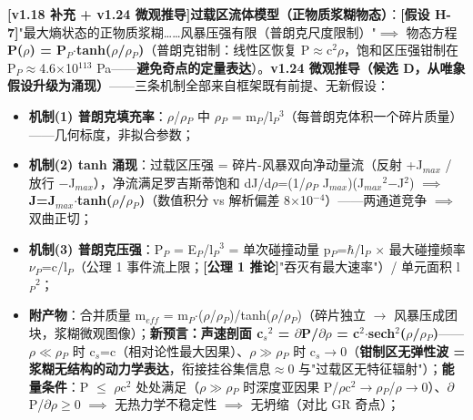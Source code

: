 \documentclass[12pt]{article}
\newcommand{\mtag}[1]{\textbf{[#1]}}
\newcommand{\up}[1]{\ensuremath{^{#1}}}
\newcommand{\down}[1]{\ensuremath{_{#1}}}
\begin{document}
\textbf{\mtag{v1.18 补充 + v1.24 微观推导}过载区流体模型（正物质浆糊物态）}：\mtag{假设 H-7}"最大熵状态的正物质浆糊\ldots{}\ldots{}风暴压强有限（普朗克尺度限制）"\ensuremath{\implies} 物态方程 \textbf{P(\ensuremath{\rho}) = P\down{P}\ensuremath{\cdot}tanh(\ensuremath{\rho}/\ensuremath{\rho}\down{P})}（普朗克钳制：线性区恢复 P\ensuremath{\approx}c\up{2}\ensuremath{\rho}，饱和区压强钳制在 P\down{P}\ensuremath{\approx}4.6\ensuremath{\times}10\up{113} Pa------\textbf{避免奇点的定量表达}）。\textbf{v1.24 微观推导（候选 D，从唯象假设升级为涌现）}------三条机制全部来自框架既有前提、无新假设：
\begin{itemize}
\item \textbf{机制(1) 普朗克填充率}：\ensuremath{\rho}/\ensuremath{\rho}\down{P} 中 \ensuremath{\rho}\down{P} = m\down{P}/l\down{P}\up{3}（每普朗克体积一个碎片质量）------几何标度，非拟合参数；
\item \textbf{机制(2) tanh 涌现}：过载区压强 = 碎片-风暴双向净动量流（反射 +J\down{max} / 放行 \ensuremath{-}J\down{max}），净流满足罗吉斯蒂饱和 dJ/d\ensuremath{\rho}=(1/\ensuremath{\rho}\down{P} J\down{max})(J\down{max}\up{2}\ensuremath{-}J\up{2}) \ensuremath{\implies} \textbf{J=J\down{max}\ensuremath{\cdot}tanh(\ensuremath{\rho}/\ensuremath{\rho}\down{P})}（数值积分 vs 解析偏差 8\ensuremath{\times}10\up{-4}）------两通道竞争 \ensuremath{\implies} 双曲正切；
\item \textbf{机制(3) 普朗克压强}：P\down{P} = E\down{P}/l\down{P}\up{3} = 单次碰撞动量 p\down{P}=\ensuremath{\hbar}/l\down{P} \ensuremath{\times} 最大碰撞频率 \ensuremath{\nu}\down{P}=c/l\down{P}（公理 1 事件流上限；\mtag{公理 1 推论}"吞灭有最大速率"）/ 单元面积 l\down{P}\up{2}；
\item \textbf{附产物}：合并质量 m\down{eff} = m\down{P}\ensuremath{\cdot}(\ensuremath{\rho}/\ensuremath{\rho}\down{P})/tanh(\ensuremath{\rho}/\ensuremath{\rho}\down{P})（碎片独立 \ensuremath{\to} 风暴压成团块，浆糊微观图像）；\textbf{新预言：声速剖面 c\down{s}\up{2} = \ensuremath{\partial}P/\ensuremath{\partial}\ensuremath{\rho} = c\up{2}\ensuremath{\cdot}sech\up{2}(\ensuremath{\rho}/\ensuremath{\rho}\down{P})}------\ensuremath{\rho}\ensuremath{\ll}\ensuremath{\rho}\down{P} 时 c\down{s}=c（相对论性最大因果）、\ensuremath{\rho}\ensuremath{\gg}\ensuremath{\rho}\down{P} 时 c\down{s}\ensuremath{\to}0（\textbf{钳制区无弹性波 = 浆糊无结构的动力学表达}，衔接挂谷集信息\ensuremath{\approx}0 与"过载区无特征辐射"）；\textbf{能量条件}：P \ensuremath{\leq} \ensuremath{\rho}c\up{2} 处处满足（\ensuremath{\rho}\ensuremath{\gg}\ensuremath{\rho}\down{P} 时深度亚因果 P/\ensuremath{\rho}c\up{2}\ensuremath{\to}\ensuremath{\rho}\down{P}/\ensuremath{\rho}\ensuremath{\to}0）、\ensuremath{\partial}P/\ensuremath{\partial}\ensuremath{\rho}\ensuremath{\geq}0 \ensuremath{\implies} 无热力学不稳定性 \ensuremath{\implies} 无坍缩（对比 GR 奇点）；
\end{itemize}
\end{document}
